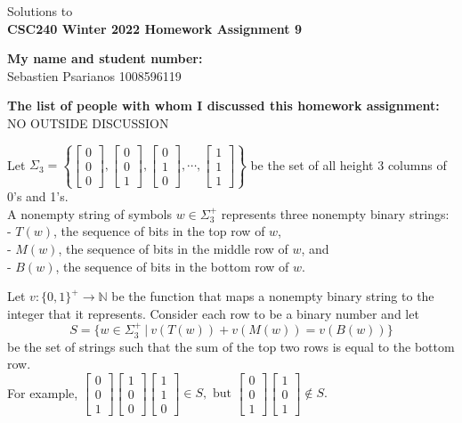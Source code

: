 \documentclass[11pt]{article}
\def\nats {{\mathbb N}}
\newcommand{\zzz}{\left [ \begin{array}{c}0\\0\\0 \end{array}\right ]}
\newcommand{\zzo}{\left [ \begin{array}{c}0\\0\\1 \end{array} \right ]}
\newcommand{\zoz}{\left [ \begin{array}{c}0\\1\\0 \end{array}\right ]}
\newcommand{\ooo}{\left [ \begin{array}{c}1\\1\\1 \end{array}\right ]}
\newcommand{\ozo}{\left [ \begin{array}{c}1\\0\\1 \end{array} \right ]}
\newcommand{\ozz}{\left [ \begin{array}{c}1\\0\\0 \end{array}\right ]}
\newcommand{\ooz}{\left [ \begin{array}{c}1\\1\\0 \end{array}\right ]}
\begin{document}
\begin{center}
Solutions to\\
{\bf \Large \bf CSC240 Winter 2022 Homework Assignment 9}
\end{center}

\noindent
{\bf My name and student number:}\\
Sebastien Psarianos 1008596119

\medskip

\noindent
{\bf The list of people with whom I discussed this homework assignment:}\\
NO OUTSIDE DISCUSSION

\begin{question}
Let $\Sigma_3 = \left \{ \zzz , \zzo, \zoz, \cdots, \ooo \right \}$
be the set of all height 3 columns of 0's and 1's.\\

A nonempty string of symbols  $w \in \Sigma_3^+$ represents three nonempty binary strings:\\
- $T(w)$, the sequence of bits in the top row of $w$,\\
- $M(w)$, the sequence of bits in the middle row of $w$, and\\
- $B(w)$,  the sequence of bits in the bottom row of $w$.

Let $v:\{0,1\}^+ \rightarrow \nats$ be the function that maps a nonempty binary string to the integer that it represents.
Consider each row to be a binary number and let
$$S = \{ w \in \Sigma_3^+ \ |\ v(T(w)) + v(M(w)) = v(B(w)) \}$$
be the set of strings such that the sum of the top two rows is equal to the bottom row.\\[6pt]
For example,
$\zzo \ozz \ooz \in S, \mbox{ but } \zzo  \ozo \not\in S.$
\end{question}
\end{document}
